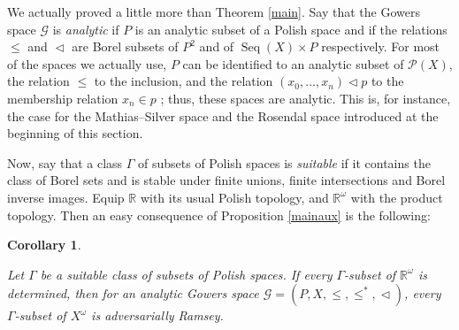 \documentclass[a4paper,11pt]{article}
\newtheorem{cor}[thm]{Corollary}
\theoremstyle{definition}
\numberwithin{equation}{section}
\newcommand{\R}{\mathbb{R}}
\newcommand{\G}{\mathcal{G}}
\DeclareMathOperator{\Seq}{Seq}
\begin{document}
We actually proved a little more than Theorem \ref{main}. Say that the Gowers space $\G$ is \emph{analytic} if $P$ is an analytic subset of a Polish space and if the relations $\leqslant$ and $\vartriangleleft$ are Borel subsets of $P^2$ and of $\Seq(X) \times P$ respectively. For most of the spaces we actually use, $P$ can be identified to an analytic subset of $\mathcal{P}(X)$, the relation $\leqslant$ to the inclusion, and the relation $(x_0, \ldots, x_n) \vartriangleleft p$ to the membership relation $x_n \in p$%
; thus, these spaces are analytic. This is, for instance, the case for the Mathias--Silver space and the Rosendal space introduced at the beginning of this section.

\smallskip

Now, say that a class $\Gamma$ of subsets of Polish spaces is \emph{suitable} if it contains the class of Borel sets and is stable under finite unions, finite intersections and Borel inverse images. Equip $\R$ with its usual Polish topology, and $\R^\omega$ with the product topology. Then an easy consequence of Proposition \ref{mainaux} is the following:

\begin{cor}\label{AdvGamma}

Let $\Gamma$ be a suitable class of subsets of Polish spaces. If every $\Gamma$-subset of $\R^\omega$ is determined, then for an analytic Gowers space $\G = (P, X, \leqslant, \leqslant^*, \vartriangleleft)$, every $\Gamma$-subset of $X^\omega$ is adversarially Ramsey.

\end{cor}
\end{document}
